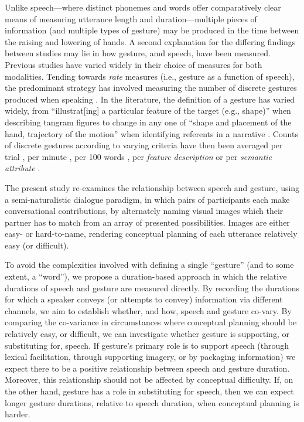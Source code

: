 \documentclass[a4paper,man,natbib]{apa6}
\newcommand*{\term}[1]{\emph{#1}} %
\begin{document}
Unlike speech---where distinct phonemes and words offer comparatively clear means of measuring utterance length and duration---multiple pieces of information (and multiple types of gesture) may be produced in the time between the raising and lowering of hands.
A second explanation for the differing findings between studies may lie in how gesture, amd speech, have been measured.
Previous studies have varied widely in their choice of measures for both modalities.
Tending towards \term{rate} measures (i.e., gesture as a function of speech), the predominant strategy has involved measuring the number of discrete gestures produced when speaking \citep[e.g.,][]{Hostetter2007, Gerwing2011, DeRuiter2012, Hoetjes2015}.
In the literature, the definition of a gesture has varied widely, from ``illustrat[ing] a particular feature of the target (e.g., shape)'' when describing tangram figures \citep[][p.~238]{DeRuiter2012} to change in any one of ``shape and placement of the hand, trajectory of the motion'' when identifying referents in a narrative \citep[][p.~118]{So2009}. %
Counts of discrete gestures according to varying criteria have then been averaged per trial \citep{Morsella2004}, per minute \citep{Mol2011}, per 100 words \citep{Masson-Carro2015, Hostetter2007, Gerwing2011, Hoetjes2015}, per \term{feature description} \citep{DeRuiter2012} or per \term{semantic attribute} \citep{Hoetjes2015}.

The present study re-examines the relationship between speech and gesture, using a semi-naturalistic dialogue paradigm, in which pairs of participants each make conversational contributions, by alternately naming visual images which their partner has to match from an array of presented possibilities.
Images are either easy- or hard-to-name, rendering conceptual planning of each utterance relatively easy (or difficult).

To avoid the complexities involved with defining a single ``gesture'' (and to some extent, a ``word''), we propose a duration-based approach in which the relative durations of speech and gesture are measured directly.
By recording the durations for which a speaker conveys (or attempts to convey) information via different channels, we aim to establish whether, and how, speech and gesture co-vary.
By comparing the co-variance in circumstances where conceptual planning should be relatively easy, or difficult, we can investigate whether gesture is supporting, or substituting for, speech.
If gesture's primary role is to support speech (through lexical facilitation, through supporting imagery, or by packaging information) we expect there to be a positive relationship between speech and gesture duration.
Moreover, this relationship should not be affected by conceptual difficulty.
If, on the other hand, gesture has a role in substituting for speech, then we can expect longer gesture durations, relative to speech duration, when conceptual planning is harder.
\end{document}
